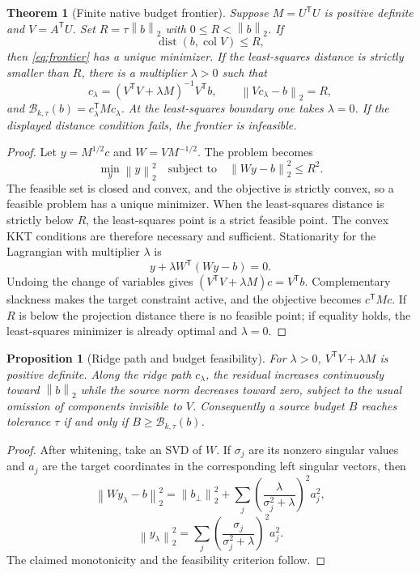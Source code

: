 \documentclass[10pt]{article}
\newtheorem{theorem}{Theorem}
\newtheorem{proposition}{Proposition}
\newcommand{\norm}[1]{\left\lVert #1\right\rVert}
\newcommand{\B}{\mathcal B}
\begin{document}
\begin{theorem}[Finite native budget frontier]
Suppose $M=U^{\mathsf T}U$ is positive definite and $V=A^{\mathsf T}U$.
Set $R=\tau\norm{b}_2$ with $0\leq R<\norm{b}_2$.  If
\[
 \operatorname{dist}(b,\operatorname{col}V)\leq R,
 \]
then \eqref{eq:frontier} has a unique minimizer.  If the least-squares
distance is strictly smaller than $R$, there is a multiplier $\lambda>0$
such that
\[
 c_\lambda=(V^{\mathsf T}V+\lambda M)^{-1}V^{\mathsf T}b,\qquad
 \norm{Vc_\lambda-b}_2=R,
 \]
and $\B_{k,\tau}(b)=c_\lambda^{\mathsf T}Mc_\lambda$.  At the
least-squares boundary one takes $\lambda=0$.  If the displayed distance
condition fails, the frontier is infeasible.
\end{theorem}

\begin{proof}
Let $y=M^{1/2}c$ and $W=VM^{-1/2}$.  The problem becomes
\[
 \min_y\norm{y}_2^2\quad\text{subject to}\quad
 \norm{Wy-b}_2^2\leq R^2.
 \]
The feasible set is closed and convex, and the objective is strictly convex,
so a feasible problem has a unique minimizer.  When the least-squares
distance is strictly below $R$, the least-squares point is a strict feasible
point.  The convex KKT conditions are therefore necessary and sufficient.
Stationarity for the Lagrangian with multiplier $\lambda$ is
\[
 y+\lambda W^{\mathsf T}(Wy-b)=0.
 \]
Undoing the change of variables gives
$(V^{\mathsf T}V+\lambda M)c=V^{\mathsf T}b$.  Complementary slackness
makes the target constraint active, and the objective becomes
$c^{\mathsf T}Mc$.  If $R$ is below the projection distance there is no
feasible point; if equality holds, the least-squares minimizer is already
optimal and $\lambda=0$.
\end{proof}

\begin{proposition}[Ridge path and budget feasibility]
For $\lambda>0$, $V^{\mathsf T}V+\lambda M$ is positive definite.  Along
the ridge path $c_\lambda$, the residual increases continuously toward
$\norm{b}_2$ while the source norm decreases toward zero, subject to the
usual omission of components invisible to $V$.  Consequently a source
budget $B$ reaches tolerance $\tau$ if and only if
$B\geq\B_{k,\tau}(b)$.
\end{proposition}

\begin{proof}
After whitening, take an SVD of $W$.  If $\sigma_j$ are its nonzero
singular values and $a_j$ are the target coordinates in the corresponding
left singular vectors, then
\[
 \norm{Wy_\lambda-b}_2^2
 =\norm{b_\perp}_2^2+
 \sum_j\left(\frac{\lambda}{\sigma_j^2+\lambda}\right)^2a_j^2,
 \]
\[
 \norm{y_\lambda}_2^2
 =\sum_j\left(\frac{\sigma_j}{\sigma_j^2+\lambda}\right)^2a_j^2.
 \]
The claimed monotonicity and the feasibility criterion follow.
\end{proof}
\end{document}
